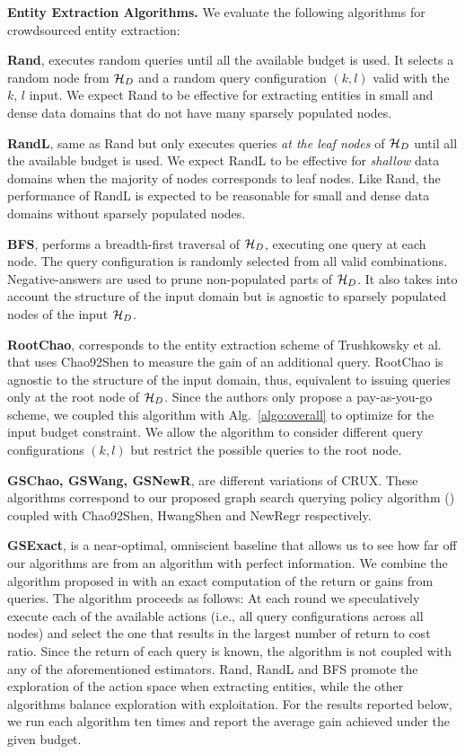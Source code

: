 \noindent\textbf{Entity Extraction Algorithms.} We evaluate the following algorithms for crowdsourced entity extraction:
\squishlist
\item {\bf Rand}, executes random queries until all the available budget is used. It selects a random node from $\mathcal{H}_D$ and a random query configuration $(k,l)$ valid with the $k$, $l$ input. \iftr We expect Rand to be effective for extracting entities in small and dense data domains that do not have many sparsely populated nodes. \fi
\item {\bf RandL}, same as Rand but only executes queries {\em at the leaf nodes} of $\mathcal{H}_D$ until all the available budget is used.  \iftr We expect RandL to be effective for {\em shallow} data domains when the majority of nodes corresponds to leaf nodes. Like Rand, the performance of RandL is expected to be reasonable for small and dense data domains without sparsely populated nodes.\fi
\item {\bf BFS}, performs a breadth-first traversal of $\mathcal{H}_D$, executing one query at each node. The query configuration is randomly selected from all valid combinations. Negative-answers are used to prune non-populated parts of $\mathcal{H}_D$. \iftr It also takes into account the structure of the input domain but is agnostic to sparsely populated nodes of the input $\mathcal{H}_D$. \fi
\item {\bf RootChao}, corresponds to the entity extraction scheme of Trush\-kowsky et al.~\cite{trushkowsky:2013,DBLP:journals/cacm/TrushkowskyKS16} that uses Chao92Shen to measure the gain of an additional query. RootChao is agnostic to the structure of the input domain, thus, equivalent to issuing queries only at the root node of $\mathcal{H}_D$. Since the authors only propose a pay-as-you-go scheme, we coupled this algorithm with Alg.~\ref{algo:overall} to optimize for the input budget constraint. We allow the algorithm to consider different query configurations $(k,l)$ but restrict the possible queries to the root node.
\item {\bf GSChao, GSWang, GSNewR}, are different variations of CRUX. These algorithms correspond to our proposed graph search querying policy algorithm () coupled with Chao92Shen, HwangShen and NewRegr respectively.
\item {\bf GSExact}, is a near-optimal, omniscient baseline that allows us to see how far off our algorithms are from an algorithm with perfect information. We combine the algorithm proposed in  with an exact computation of the return or gains from queries. 
\iftr The algorithm proceeds as follows: At each round we speculatively execute each of the available actions (i.e., all query configurations across all nodes) and select the one that results in the largest number of return to cost ratio. Since the return of each query is known, the algorithm is not coupled with any of the aforementioned estimators.
\fi
\squishend
\iftr
Rand, RandL and BFS promote the exploration of the action space when extracting entities, while the other algorithms balance exploration with exploitation. 
\fi For the results reported below, we run each algorithm ten times and report the average gain achieved under the given budget.


